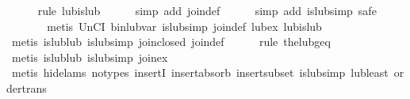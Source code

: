 \begin{isabellebody}
%
\isadelimproof
\ \ \ \ %
\endisadelimproof
%
\isatagproof
{}\isamarkupfalse%
\ {}rule\ lub{}is{}lub{}\isanewline
\ \ \ \ \isamarkupfalse%
\ {}simp\ add{}\ join{}def{}\isanewline
\ \ \ \ \isamarkupfalse%
\ {}simp\ add{}\ is{}lub{}simp{}\ safe{}\isanewline
\ \ \ \ \isamarkupfalse%
\ {}\isanewline
\ \ \ \ \isamarkupfalse%
\ {}metis\ UnCI\ bin{}lub{}var\ is{}lub{}simp\ join{}def\ lub{}ex\ lub{}is{}lub{}\isanewline
\ \ \ \ \isamarkupfalse%
\ {}metis\ is{}lub{}lub\ is{}lub{}simp\ join{}closed\ join{}def{}\isanewline
\ \ \ \ \isamarkupfalse%
\ {}rule\ the{}lub{}geq{}\isanewline
\ \ \ \ \isamarkupfalse%
\ {}metis\ is{}lub{}lub\ is{}lub{}simp\ join{}ex{}\isanewline
\ \ \ \ \isamarkupfalse%
\ {}metis\ {}hide{}lams{}\ no{}types{}\ insertI{}\ insert{}absorb\ insert{}subset\ is{}lub{}simp\ lub{}least\ order{}trans{}\isanewline

\end{isabellebody}
